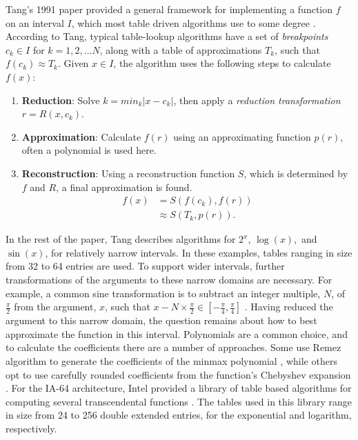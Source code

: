 \documentclass{fac}
\newcommand{\abs}[1]{\lvert#1\rvert}
\begin{document}
Tang's 1991 paper provided a general framework for implementing a function $f$ on an interval $I$, which most table driven algorithms use to some degree \cite{tang1991table}. According to Tang, typical table-lookup algorithms have a set of \textit{breakpoints} $c_k \in I$ for $k=1, 2, ... N$, along with a table of approximations $T_k$, such that $f(c_k) \approx T_k$. Given $x \in I$, the algorithm uses the following steps to calculate $f(x)$:
\begin{enumerate}

\item \textbf{Reduction}: Solve $k = min_k \abs{x-c_k}$, then apply a \textit{reduction transformation} $r = R(x,c_k)$.

\item \textbf{Approximation}: Calculate $f(r)$ using an approximating function $p(r)$, often a polynomial is used here.

\item \textbf{Reconstruction}: Using a reconstruction function $S$, which is determined by $f$ and $R$, a final approximation is found.
\begin{align*}
    f(x) &= S(f(c_k),f(r)) \\
         &\approx S(T_k,p(r)).
\end{align*}

\end{enumerate} 

In the rest of the paper, Tang describes algorithms for $2^x$, $\log(x),$ and $\sin{(x)}$, for relatively narrow intervals. In these examples, tables ranging in size from 32 to 64 entries are used. To support wider intervals, further transformations of the arguments to these narrow domains are necessary. For example, a common sine transformation is to subtract an integer multiple, $N$, of $\frac{\pi}{2}$ from the argument, $x$, such that $x-N \times \frac{\pi}{2} \in [-\frac{\pi}{4}, \frac{\pi}{4}]$ \cite{harrison2006floating,harrison2000formal}. Having reduced the argument to this narrow domain, the question remains about how to best approximate the function in this interval. Polynomials are a common choice, and to calculate the coefficients there are a number of approaches. Some use Remez algorithm to generate the coefficients of the minmax polynomial \cite{veidinger1960numerical,tang1991table}, while others opt to use carefully rounded coefficients from the function's Chebyshev expansion \cite{378099}. For the IA-64 architecture, Intel provided a library of table based algorithms for computing several transcendental functions \cite{harrison1999computation}. The tables used in this library range in size from 24 to 256 double extended entries, for the exponential and logarithm, respectively.
\end{document}
